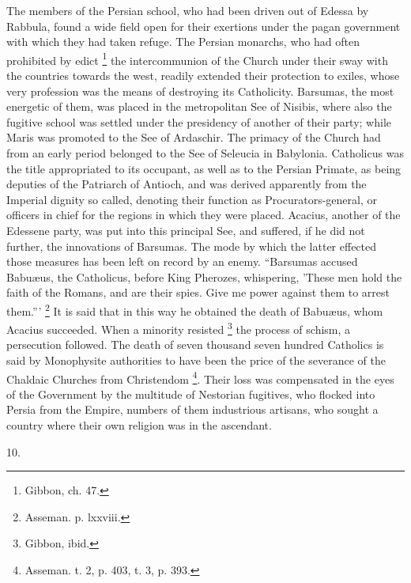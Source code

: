 The members of the Persian school, who had been driven out of
Edessa by Rabbula, found a wide field open for their exertions under
the pagan government with which they had taken refuge. The Persian
monarchs, who had often prohibited by edict \footnote{Gibbon, ch. 47.} the intercommunion of the Church under their sway with the
countries towards the west, readily extended their protection to
exiles, whose very profession was the means of destroying its
Catholicity. Barsumas, the most energetic of them, was placed in the
metropolitan See of Nisibis, where also the fugitive school was
settled under the presidency of another of their party; while Maris
was promoted to the See of Ardaschir. The primacy of the Church had
from an early period belonged to the See of Seleucia in Babylonia.
Catholicus was the title appropriated to its occupant, as well as to
the Persian Primate, as being deputies of the Patriarch of Antioch,
and was derived apparently from the Imperial dignity so called,
denoting their function as Procurators-general, or officers in chief
for the regions in which they were placed. Acacius, another of the
Edessene party, was put into this principal See, and suffered, if he
did not further, the innovations of Barsumas. The mode by which the
latter effected those measures has been left on record by an enemy.
``Barsumas accused Babuæus, the Catholicus, before King Pherozes,
whispering, 'These men hold the faith of the Romans, and are their
spies. Give me power against them to arrest them.''' \footnote{Asseman. p. lxxviii.} It is said that in this way he obtained the death of Babuæus,
whom Acacius succeeded. When a minority resisted \footnote{Gibbon, ibid.} the process of schism, a persecution followed. The death of
seven thousand seven hundred Catholics is said by Monophysite
authorities to have been the price of the severance of the Chaldaic
Churches from Christendom \footnote{Asseman. t. 2, p. 403, t. 3, p. 393.}.
Their loss was compensated in the eyes of the Government by the
multitude of Nestorian fugitives, who flocked into Persia from the
Empire, numbers of them industrious artisans, who sought a country
where their own religion was in the ascendant.

10.

